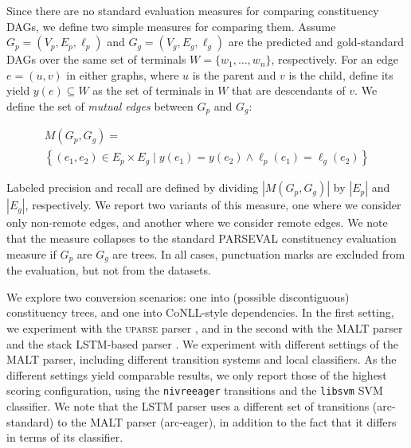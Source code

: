 \documentclass[11pt]{article}
\begin{document}
Since there are no standard evaluation measures for comparing constituency DAGs, we define
two simple measures for comparing them.
Assume $G_p=(V_p,E_p,\ell_p)$ and $G_g=(V_g,E_g,\ell_g)$
are the predicted and gold-standard DAGs over the same
set of terminals $W = \{w_1,\ldots,w_n\}$, respectively.
For an edge $e=(u,v)$ in either graphs,
where $u$ is the parent and $v$ is the child, define its yield $y(e) \subseteq W$ as the
set of terminals in $W$ that are descendants of $v$.
We define the set of \textit{mutual edges} between $G_p$ and $G_g$:

\vspace{-.5cm}

{\small
\begin{multline*}
    M(G_p,G_g) = \\
    \left\{(e_1,e_2) \in E_p \times E_g \;|\;
    y(e_1) = y(e_2) \wedge \ell_p(e_1)=\ell_g(e_2)\right\}
\end{multline*}
}

\vspace{-.5cm}

Labeled precision and recall are defined by dividing $|M(G_p,G_g)|$ by $|E_p|$ and $|E_g|$, respectively.
We report two variants of this measure, one where we consider only non-remote edges,
and another where we consider remote edges. We note that the measure collapses to the standard
PARSEVAL constituency evaluation measure if $G_p$ are $G_g$ are trees.
In all cases, punctuation marks are excluded from the evaluation, but not from the datasets.


We explore two conversion scenarios: one into (possible discontiguous) constituency trees,
and one into CoNLL-style dependencies. In the first setting, we experiment with the \textsc{uparse}
parser \cite{maier2015discontinuous}, and in the second with the MALT
parser \cite{nivre2007maltparser} and the stack LSTM-based parser \cite{dyer2015transition}.
We experiment with different settings of the MALT parser, including
different transition systems and local classifiers. As the different
settings yield comparable results, we only report those of the highest
scoring configuration, using the \texttt{nivreeager} transitions
and the \texttt{libsvm} SVM classifier.
We note that the LSTM parser uses a different set of transitions (arc-standard) to the
MALT parser (arc-eager),
in addition to the fact that it differs in terms of its classifier.
\end{document}
